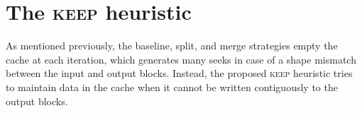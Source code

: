\documentclass[sigconf, nonacm]{acmart}
\newcommand{\keep}[0]{\textsc{keep}\xspace}
\begin{document}





\section{The \keep heuristic}

As mentioned previously, the baseline, split, and merge strategies empty
the cache at each iteration, which generates many seeks in case of a shape
mismatch between the input and output blocks. Instead, the proposed
\keep heuristic tries to maintain data in the cache when it cannot be written
contiguously to the output blocks. 

\end{document}
